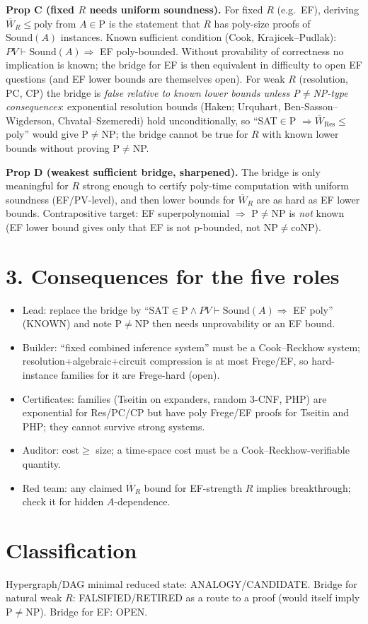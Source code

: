 \documentclass{article}
\begin{document}
\textbf{Prop C (fixed $R$ needs uniform soundness).} For fixed $R$ (e.g.\ EF), deriving $\overline W_R\le\mathrm{poly}$ from $A\in\mathrm P$ is the statement that $R$ has poly-size proofs of $\mathrm{Sound}(A)$ instances. Known sufficient condition (Cook, Krajicek--Pudlak): $PV\vdash\mathrm{Sound}(A)\Rightarrow$ EF poly-bounded. Without provability of correctness no implication is known; the bridge for EF is then equivalent in difficulty to open EF questions (and EF lower bounds are themselves open). For weak $R$ (resolution, PC, CP) the bridge is \emph{false relative to known lower bounds unless P$\ne$NP-type consequences}: exponential resolution bounds (Haken; Urquhart, Ben-Sasson--Wigderson, Chvatal--Szemeredi) hold unconditionally, so ``SAT$\in$P $\Rightarrow\overline W_{\mathrm{Res}}\le$poly'' would give P$\ne$NP; the bridge cannot be true for $R$ with known lower bounds without proving P$\ne$NP.

\textbf{Prop D (weakest sufficient bridge, sharpened).} The bridge is only meaningful for $R$ strong enough to certify poly-time computation with uniform soundness (EF/PV-level), and then lower bounds for $\overline W_R$ are as hard as EF lower bounds. Contrapositive target: EF superpolynomial $\Rightarrow$ P$\ne$NP is \emph{not} known (EF lower bound gives only that EF is not p-bounded, not NP$\ne$coNP).

\section*{3. Consequences for the five roles}
\begin{itemize}
\item Lead: replace the bridge by ``$\mathrm{SAT}\in\mathrm P\wedge PV\vdash\mathrm{Sound}(A)\Rightarrow$ EF poly'' (KNOWN) and note P$\ne$NP then needs unprovability or an EF bound.
\item Builder: ``fixed combined inference system'' must be a Cook--Reckhow system; resolution+algebraic+circuit compression is at most Frege/EF, so hard-instance families for it are Frege-hard (open).
\item Certificates: families (Tseitin on expanders, random 3-CNF, PHP) are exponential for Res/PC/CP but have poly Frege/EF proofs for Tseitin and PHP; they cannot survive strong systems.
\item Auditor: cost$\ge$ size; a time-space cost must be a Cook--Reckhow-verifiable quantity.
\item Red team: any claimed $\overline W_R$ bound for EF-strength $R$ implies breakthrough; check it for hidden $A$-dependence.
\end{itemize}

\section*{Classification}
Hypergraph/DAG minimal reduced state: ANALOGY/CANDIDATE. Bridge for natural weak $R$: FALSIFIED/RETIRED as a route to a proof (would itself imply P$\ne$NP). Bridge for EF: OPEN.
\end{document}

